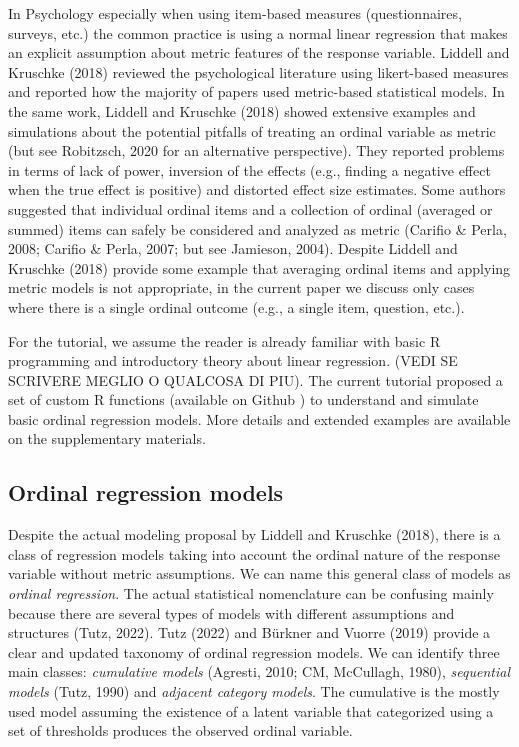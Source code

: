 \documentclass[
  man,floatsintext]{apa6}
\begin{document}
In Psychology especially when using item-based measures (questionnaires, surveys, etc.) the common practice is using a normal linear regression that makes an explicit assumption about metric features of the response variable. Liddell and Kruschke (2018) reviewed the psychological literature using likert-based measures and reported how the majority of papers used metric-based statistical models. In the same work, Liddell and Kruschke (2018) showed extensive examples and simulations about the potential pitfalls of treating an ordinal variable as metric (but see Robitzsch, 2020 for an alternative perspective). They reported problems in terms of lack of power, inversion of the effects (e.g., finding a negative effect when the true effect is positive) and distorted effect size estimates. Some authors suggested that individual ordinal items and a collection of ordinal (averaged or summed) items can safely be considered and analyzed as metric (Carifio \& Perla, 2008; Carifio \& Perla, 2007; but see Jamieson, 2004). Despite Liddell and Kruschke (2018) provide some example that averaging ordinal items and applying metric models is not appropriate, in the current paper we discuss only cases where there is a single ordinal outcome (e.g., a single item, question, etc.).

For the tutorial, we assume the reader is already familiar with basic R programming and introductory theory about linear regression. (VEDI SE SCRIVERE MEGLIO O QUALCOSA DI PIU). The current tutorial proposed a set of custom R functions (available on Github ) to understand and simulate basic ordinal regression models. More details and extended examples are available on the supplementary materials.

\subsection{Ordinal regression models}\label{ordinal-regression-models}

Despite the actual modeling proposal by Liddell and Kruschke (2018), there is a class of regression models taking into account the ordinal nature of the response variable without metric assumptions. We can name this general class of models as \emph{ordinal regression}. The actual statistical nomenclature can be confusing mainly because there are several types of models with different assumptions and structures (Tutz, 2022). Tutz (2022) and Bürkner and Vuorre (2019) provide a clear and updated taxonomy of ordinal regression models. We can identify three main classes: \emph{cumulative models} (Agresti, 2010; CM, McCullagh, 1980), \emph{sequential models} (Tutz, 1990) and \emph{adjacent category models}. The cumulative is the mostly used model assuming the existence of a latent variable that categorized using a set of thresholds produces the observed ordinal variable.
\end{document}
